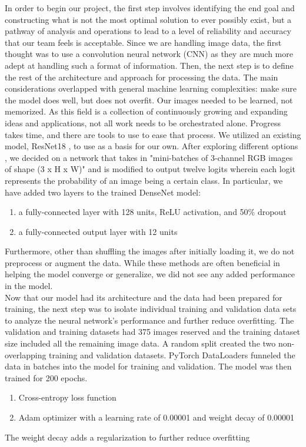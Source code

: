 \documentclass[10pt]{article}
\begin{document}
\indent In order to begin our project, the first step involves identifying the end goal and constructing what is not the most optimal solution to ever possibly exist, but a pathway of analysis and operations to lead to a level of reliability and accuracy that our team feels is acceptable. Since we are handling image data, the first thought was to use a convolution neural network (CNN) as they are much more adept at handling such a format of information. Then, the next step is to define the rest of the architecture and approach for processing the data. The main considerations overlapped with general machine learning complexities: make sure the model does well, but does not overfit. Our images needed to be learned, not memorized. 
\newline
\indent As this field is a collection of continuously growing and expanding ideas and applications, not all work needs to be orchestrated alone. Progress takes time, and there are tools to use to ease that process. We utilized an existing model, ResNet18 \cite{resnet}, to use as a basis for our own. After exploring different options \cite{ben}, we decided on a network that takes in "mini-batches of 3-channel RGB images of shape (3 x H x W)" \cite{densenet} and is modified to output twelve logits wherein each logit represents the probability of an image being a certain class. In particular, we have added two layers \cite{ridnik2023mldecoder} to the trained DenseNet model: 
\begin{enumerate}
\item a fully-connected layer with 128 units, ReLU activation, and  50\% dropout
\item a fully-connected output layer with 12 units
\end{enumerate}
\indent Furthermore, other than shuffling the images after initially loading it, we do not preprocess or augment the data. While these methods are often beneficial in helping the model converge or generalize, we did not see any added performance in the model.
\\
\indent Now that our model had its architecture and the data had been prepared for training, the next step was to isolate individual training and validation data sets to analyze the neural network’s performance and further reduce overfitting. The validation and training datasets had 375 images reserved and the training dataset size included all the remaining image data. A random split created the two non-overlapping training and validation datasets. PyTorch DataLoaders funneled the data in batches into the model for training and validation. The model was then trained for 200 epochs.
\begin{enumerate}
\item Cross-entropy loss function
\item Adam optimizer with a learning rate of 0.00001 and weight decay of 0.00001
\end{enumerate}
The weight decay adds a regularization to further reduce overfitting
\end{document}
